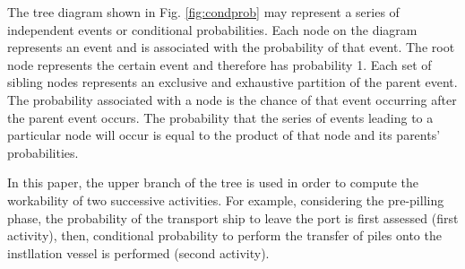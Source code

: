 The tree diagram shown in Fig. \ref{fig:condprob} may represent a series of independent events or conditional probabilities. Each node on the diagram represents an event and is associated with the probability of that event. The root node represents the certain event and therefore has probability 1. Each set of sibling nodes represents an exclusive and exhaustive partition of the parent event. The probability associated with a node is the chance of that event occurring after the parent event occurs. The probability that the series of events leading to a particular node will occur is equal to the product of that node and its parents' probabilities.

In this paper, the upper branch of the tree is used in order to compute the workability of two successive activities. For example, considering the pre-pilling phase, the probability of the transport ship to leave the port is first assessed (first activity), then, conditional probability to perform the transfer of piles onto the instllation vessel is performed (second activity).